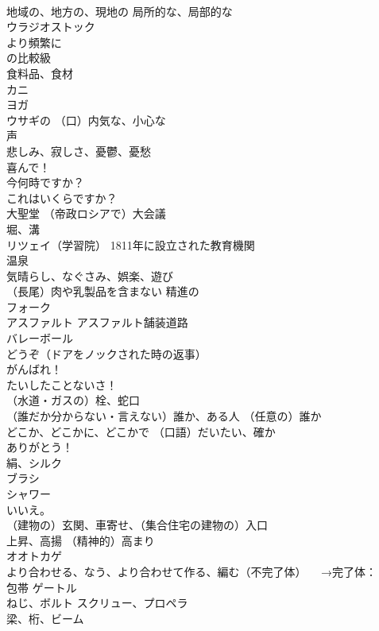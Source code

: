 \documentclass[8pt]{extreport}
\begin{document}
\begin{CJK}{UTF8}{min}
\\	地域の、地方の、現地の 局所的な、局部的な
\\	ウラジオストック
\\	より頻繁に 
\\	の比較級
\\	食料品、食材
\\	カニ
\\	ヨガ
\\	ウサギの （口）内気な、小心な
\\	声
\\	悲しみ、寂しさ、憂鬱、憂愁
\\	喜んで！
\\	今何時ですか？
\\	これはいくらですか？
\\	大聖堂 （帝政ロシアで）大会議
\\	堀、溝 
\\	リツェイ（学習院） 1811年に設立された教育機関
\\	温泉
\\	気晴らし、なぐさみ、娯楽、遊び
\\	（長尾）肉や乳製品を含まない 精進の
\\	フォーク
\\	アスファルト アスファルト舗装道路
\\	バレーボール
\\	どうぞ（ドアをノックされた時の返事）
\\	がんばれ！
\\	たいしたことないさ！
\\	（水道・ガスの）栓、蛇口
\\	[不定]（誰だか分からない・言えない）誰か、ある人 （任意の）誰か
\\	どこか、どこかに、どこかで （口語）だいたい、確か
\\	ありがとう！
\\	絹、シルク
\\	ブラシ
\\	シャワー
\\	いいえ。
\\	（建物の）玄関、車寄せ、（集合住宅の建物の）入口
\\	上昇、高揚 （精神的）高まり
\\	オオトカゲ
\\	より合わせる、なう、より合わせて作る、編む（不完了体） 　→完了体：
\\	包帯 ゲートル
\\	ねじ、ボルト スクリュー、プロペラ
\\	梁、桁、ビーム

\end{CJK}
\end{document}

